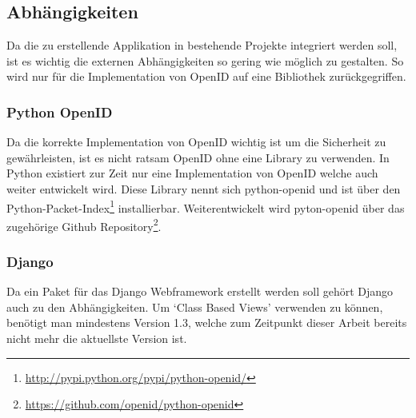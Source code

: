 \subsection{Abhängigkeiten}
\label{sub:Abhängigkeiten}
Da die zu erstellende Applikation in bestehende Projekte integriert werden soll, ist es wichtig die externen Abhängigkeiten so gering wie möglich zu gestalten. So wird nur für die Implementation von OpenID auf eine Bibliothek zurückgegriffen.

\subsubsection{Python OpenID}
\label{ssub:Python OpenID}
Da die korrekte Implementation von OpenID wichtig ist um die Sicherheit zu gewährleisten, ist es nicht ratsam OpenID ohne eine Library zu verwenden. In Python existiert zur Zeit nur eine Implementation von OpenID welche auch weiter entwickelt wird. Diese Library nennt sich python-openid und ist über den Python-Packet-Index\footnote{\url{http://pypi.python.org/pypi/python-openid/}} installierbar. Weiterentwickelt wird pyton-openid über das zugehörige Github Repository\footnote{\url{https://github.com/openid/python-openid}}.

\subsubsection{Django}
\label{ssub:Django}
Da ein Paket für das Django Webframework erstellt werden soll gehört Django auch zu den Abhängigkeiten. Um `Class Based Views' verwenden zu können, benötigt man mindestens Version 1.3, welche zum Zeitpunkt dieser Arbeit bereits nicht mehr die aktuellste Version ist.
